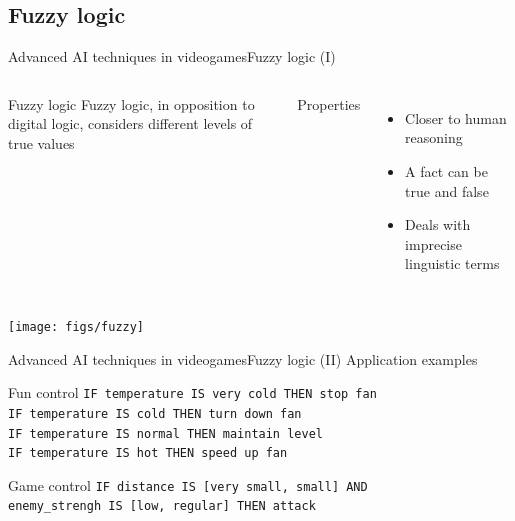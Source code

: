\documentclass[10pt,compress]{beamer} %
\begin{document}
\subsection{Fuzzy logic}
\begin{frame}{Advanced AI techniques in videogames}{Fuzzy logic (I)}
    \begin{columns}
	   \vspace{-0.8cm}
		\begin{block}{Fuzzy logic}
		Fuzzy logic, in opposition to digital logic, considers different levels of true values
		\end{block}
		Properties
		\begin{itemize}
		\item Closer to human reasoning
		\item A fact can be true and false
		\item Deals with imprecise linguistic terms
		\end{itemize}
	\end{columns}

		\centering\texttt{[image: figs/fuzzy]}\\
\end{frame}

\begin{frame}{Advanced AI techniques in videogames}{Fuzzy logic (II)}
	\centering Application examples
		\begin{exampleblock}{Fun control}
		\texttt{IF temperature IS very cold THEN stop fan\\
IF temperature IS cold THEN turn down fan\\
IF temperature IS normal THEN maintain level\\
IF temperature IS hot THEN speed up fan\\
}
		\end{exampleblock}
		\begin{exampleblock}{Game control}
\texttt{IF distance IS [very small, small] AND \\
	enemy\_strengh IS [low, regular] THEN attack		
	}
		\end{exampleblock}
\end{frame}


\end{document}
